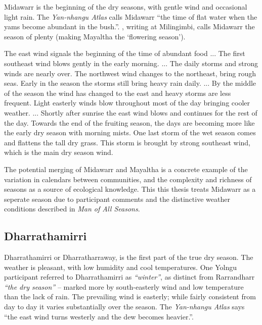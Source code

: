 Midawarr is the beginning of the dry seasons, with gentle wind and occasional
light rain.  The \textit{Yan-nhangu Atlas} calls Midawarr ``the time of flat
water when the yams become abundant in the bush.''.  \citet{davis1989}, writing
at Milingimbi, calls Midawarr the season of plenty (making Mayaltha the `flowering season').
\begin{bquote}{\citet{davis1989}}
    The east wind signals the beginning of the time of abundant food ...
    The first southeast wind blows gently in the early morning. ...
    The daily storms and strong winds are nearly over.
    The northwest wind changes to the northeast, bring rough seas.
    Early in the season the storms still bring heavy rain daily.
    ...
    By the middle of the season the wind has changed to the east and
    heavy storms are less frequent.  Light easterly winds blow
    throughout most of the day bringing cooler weather.
    ...
    Shortly after sunrise the east wind blows and continues for the
    rest of the day.  Towards the end of the fruiting season, the days
    are becoming  more like the early dry season with morning mists.
    One last storm of the wet season comes and flattens the tall dry grass.
    This storm is brought by strong southeast wind, which is the main dry season wind.
\end{bquote}

The potential merging of Midawarr and Mayaltha is a concrete example of the
variation in calendars between communities, and the complexity and richness
of seasons as a source of ecological knowledge.  This this thesis treats
Midawarr as a seperate season due to participant comments and the distinctive
weather conditions described in \textit{Man of All Seasons}.


\subsection{Dharrathamirri}
Dharrathamirri or Dharratharraway, is the first part of the
true dry season.  The weather is pleasant, with low humidity and cool
temperatures.  One Yolngu participant referred to Dharrathamirri as \textsl{``winter''},
as distinct from Rarrandharr \textsl{``the dry season''} -- marked more by south-easterly wind
and low temperature than the lack of rain.
%
The prevailing wind is easterly; while fairly consistent from day to day
it varies substantially over the season.  The \textit{Yan-nhangu Atlas}
says ``the east wind turns westerly and the dew becomes heavier.''.

